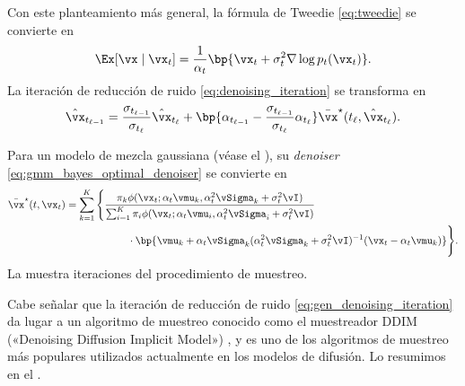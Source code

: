 \documentclass[../../book-main.tex]{subfiles}
\begin{document}
Con este planteamiento más general, la fórmula de Tweedie \eqref{eq:tweedie} se convierte en
\begin{equation}\label{eq:gen_tweedie}
    \Ex[\vx \mid \vx_{t}] = \frac{1}{\alpha_{t}}\bp{\vx_{t} +
    \sigma_{t}^{2}\nabla \log p_{t}(\vx_{t})}.
\end{equation}
La iteración de reducción de ruido \eqref{eq:denoising_iteration} se transforma en
\begin{equation}\label{eq:gen_denoising_iteration}
    \hat{\vx}_{t_{\ell - 1}} = \frac{\sigma_{t_{\ell -
    1}}}{\sigma_{t_{\ell}}}\hat{\vx}_{t_{\ell}} + \bp{\alpha_{t_{\ell
        - 1}} - \frac{\sigma_{t_{\ell -
    1}}}{\sigma_{t_{\ell}}}\alpha_{t_{\ell}}}\bar{\vx}^{\star}(t_{\ell},
    \hat{\vx}_{t_{\ell}}).
\end{equation}

\begin{example}
    Para un modelo de mezcla gaussiana (véase el ),
    su \textit{denoiser} \eqref{eq:gmm_bayes_optimal_denoiser} se convierte en
    \begin{align}\label{eq:gen_gmm_bayes_optimal_denoiser}
        \bar{\vx}^{\star}(t, \vx_{t})
        &= \sum_{k = 1}^{K}\Bigg\{\frac{\pi_{k}\phi(\vx_{t}
                    ; \alpha_{t}\vmu_{k}, \alpha_{t}^{2}\vSigma_{k}
            + \sigma_{t}^{2}\vI)}{\sum_{i = 1}^{K}\pi_{i}\phi(\vx_{t} ;
                    \alpha_{t}\vmu_{i}, \alpha_{t}^{2}\vSigma_{i} +
            \sigma_{t}^{2}\vI)} \\
            &\qquad \qquad \qquad \cdot\bp{\vmu_{k} +
                \alpha_{t}\vSigma_{k}(\alpha_{t}^{2}\vSigma_{k} +
        \sigma_{t}^{2}\vI)^{-1}(\vx_{t} - \alpha_{t}\vmu_{k})}\Bigg\}. \nonumber
    \end{align}
    La  muestra iteraciones del procedimiento
    de muestreo.
\end{example}

Cabe señalar que la iteración de reducción de ruido \eqref{eq:gen_denoising_iteration}
da lugar a un algoritmo de muestreo conocido como el muestreador DDIM («Denoising Diffusion
Implicit Model») \cite{song2020denoising}, y es uno de los
algoritmos de muestreo más populares utilizados actualmente en los modelos de difusión. Lo
resumimos en el .
\end{document}
